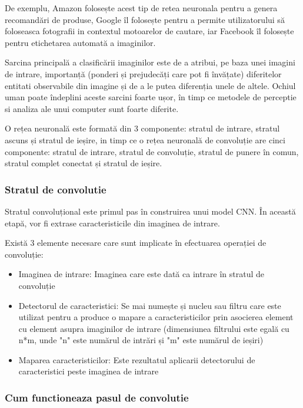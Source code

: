 \documentclass[10pt]{article}
\begin{document}
\> De exemplu, Amazon folosește acest tip de retea neuronala pentru a genera recomandări de produse, Google îl folosește pentru a permite utilizatorului să foloseasca fotografii in contextul motoarelor de cautare, iar Facebook îl folosește pentru etichetarea automată a imaginilor.

\> Sarcina principală a clasificării imaginilor este de a atribui, pe baza unei imagini de intrare, importanță (ponderi și prejudecăți care pot fi învățate) diferitelor entitati observabile din imagine și de a le putea diferenția unele de altele.
Ochiul uman poate îndeplini aceste sarcini foarte ușor, în timp ce metodele de perceptie si analiza ale unui computer sunt foarte diferite.

\> O rețea neuronală este formată din 3 componente: stratul de intrare, stratul ascuns și stratul de ieșire, in timp ce o rețea neuronală de convoluție are cinci componente:
stratul de intrare, stratul de convoluție, stratul de punere în comun, stratul complet conectat și stratul de ieșire.

\newpage

\subsubsection{Stratul de convolutie}

\> Stratul convoluțional este primul pas în construirea unui model CNN. În această etapă, vor fi extrase caracteristicile din imaginea de intrare.

\> Există 3 elemente necesare care sunt implicate în efectuarea operației de convoluție:

\begin{itemize}
\item Imaginea de intrare: Imaginea care este dată ca intrare în stratul de convoluție
\item Detectorul de caracteristici: Se mai numește și nucleu sau filtru care este utilizat pentru a produce o mapare a caracteristicilor prin asocierea element cu element asupra imaginilor de intrare
(dimensiunea filtrului este egală cu n*m, unde "n" este numărul de intrări și "m" este numărul de ieșiri)
\item Maparea caracteristicilor: Este rezultatul aplicarii detectorului de caracteristici peste imaginea de intrare 
\end{itemize}

\subsubsection{Cum functioneaza pasul de convolutie}
\end{document}
